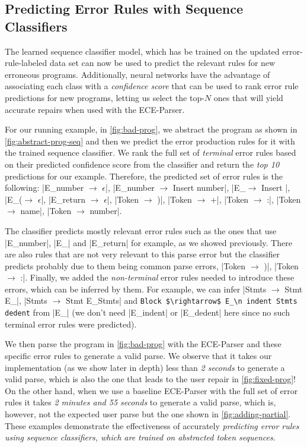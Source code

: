 \subsection{Predicting Error Rules with Sequence Classifiers}
\label{sec:overview:seq-classifiers}

The learned sequence classifier model,
which has be trained on the updated
error-rule-labeled data set can now
be used to predict the relevant rules
for new erroneous programs.
%
Additionally, neural networks have
the advantage of associating each
class with a \emph{confidence score}
that can be used to rank error rule
predictions for new programs, letting
us select the top-$N$ ones that will
yield accurate repairs when used
with the ECE-Parser.

For our running example, in \autoref{fig:bad-prog}, we abstract the program as
shown in \autoref{fig:abstract-prog-seq} and then we predict the error
production rules for it with the trained sequence classifier. We rank the full
set of \emph{terminal} error rules based on their predicted confidence score
from the classifier and return the \emph{top 10} predictions for our example.
Therefore, the predicted set of error rules is the following:
%
|E_number $\rightarrow$ $\epsilon$|,
%
|E_number $\rightarrow$ Insert number|, |E_\n $\rightarrow$ Insert \n|,
%
|E_($\rightarrow$ $\epsilon$|,
%
|E_return $\rightarrow$ $\epsilon$|, |Token $\rightarrow$ )|,
%
|Token $\rightarrow$ +|, |Token $\rightarrow$ :|, |Token $\rightarrow$ name|,
%
|Token $\rightarrow$ number|.

The classifier predicts mostly relevant error rules such as the ones that use
|E_number|, |E_\n| and |E_return| for example, as we showed previously. There
are also rules that are not very relevant to this parse error but the classifier
predicts probably due to them being common parse errors, \eg
%
|Token $\rightarrow$ )|, |Token $\rightarrow$ :|. Finally, we added the
\emph{non-terminal} error rules needed to introduce these errors, which can be
inferred by them. For example, we can infer
%
|Stmts $\rightarrow$ Stmt E_\n|, |Stmts $\rightarrow$ Stmt E_\n Stmts| and
%
\lstinline{Block $\rightarrow$ E_\n indent Stmts dedent} from |E_\n| (we don't
need \linebreak |E_indent| or |E_dedent| here since no such terminal error rules were
predicted).

We then parse the program in \autoref{fig:bad-prog} with the ECE-Parser and
these specific error rules to generate a valid parse. We observe that it takes
our implementation (as we show later in depth) less than \emph{2 seconds} to
generate a valid parse, which is also the one that leads to the user repair in
\autoref{fig:fixed-prog}! On the other hand, when we use a baseline ECE-Parser
with the full set of error rules it takes \emph{2 minutes and 55 seconds} to
generate a valid parse, which is, however, not the expected user parse but the
one shown in \autoref{fig:adding-partial}. These examples demonstrate the
effectiveness of accurately \emph{predicting error rules using sequence
classifiers, which are trained on abstracted token sequences}.

